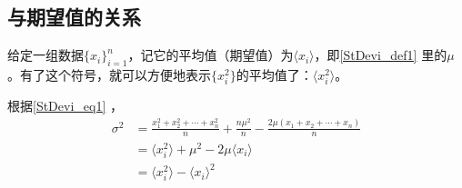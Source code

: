 \subsection{与期望值的关系}

给定一组数据$\{x_i\}_{i=1}^n$，记它的平均值（期望值）为$\langle x_i \rangle$，即\autoref{StDevi_def1} 里的$\mu$。有了这个符号，就可以方便地表示$\{x_i^2\}$的平均值了：$\langle x_i^2 \rangle$。

根据\autoref{StDevi_eq1} ，
\begin{equation}
\begin{aligned}
\sigma^2 &= \frac{x_1^2+x_2^2+\cdots+x_n^2}{n}+\frac{n\mu^2}{n}-\frac{2\mu(x_1+x_2+\cdots+x_n)}{n}\\
&=\langle x_i^2 \rangle+\mu^2-2\mu\langle x_i \rangle\\
&=\langle x_i^2 \rangle-\langle x_i \rangle^2
\end{aligned}
\end{equation}
